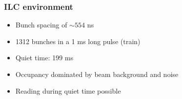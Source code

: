 \documentclass{beamer}
\begin{document}
  \begin{frame}
    \frametitle{ILC environment}

    \begin{itemize}
      \item Bunch spacing of $\sim 554$ ns
      \item 1312 bunches in a 1 ms long pulse (train)
      \item Quiet time: 199 ms
      \item Occupancy dominated by beam background and noise
      \item Reading during quiet time possible
    \end{itemize}

  \end{frame}
\end{document}

